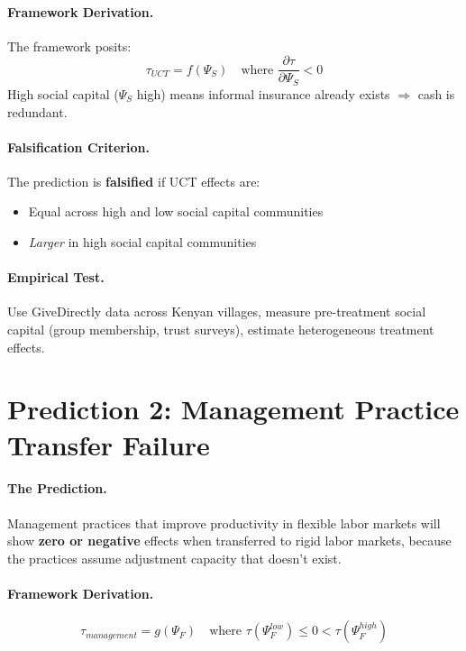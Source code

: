 \paragraph{Framework Derivation.}
The framework posits:
\begin{equation}
    \tau_{UCT} = f(\Psi_S) \quad \text{where } \frac{\partial \tau}{\partial \Psi_S} < 0
\end{equation}
High social capital ($\Psi_S$ high) means informal insurance already exists $\Rightarrow$ cash is redundant.

\paragraph{Falsification Criterion.}
The prediction is \textbf{falsified} if UCT effects are:
\begin{itemize}
    \item Equal across high and low social capital communities
    \item \textit{Larger} in high social capital communities
\end{itemize}

\paragraph{Empirical Test.}
Use GiveDirectly data across Kenyan villages, measure pre-treatment social capital (group membership, trust surveys), estimate heterogeneous treatment effects.


\section{Prediction 2: Management Practice Transfer Failure}
\label{sec:S-prediction2}

\paragraph{The Prediction.}
Management practices that improve productivity in flexible labor markets will show \textbf{zero or negative} effects when transferred to rigid labor markets, because the practices assume adjustment capacity that doesn't exist.

\paragraph{Framework Derivation.}
\begin{equation}
    \tau_{management} = g(\Psi_F) \quad \text{where } \tau(\Psi_F^{low}) \leq 0 < \tau(\Psi_F^{high})
\end{equation}


